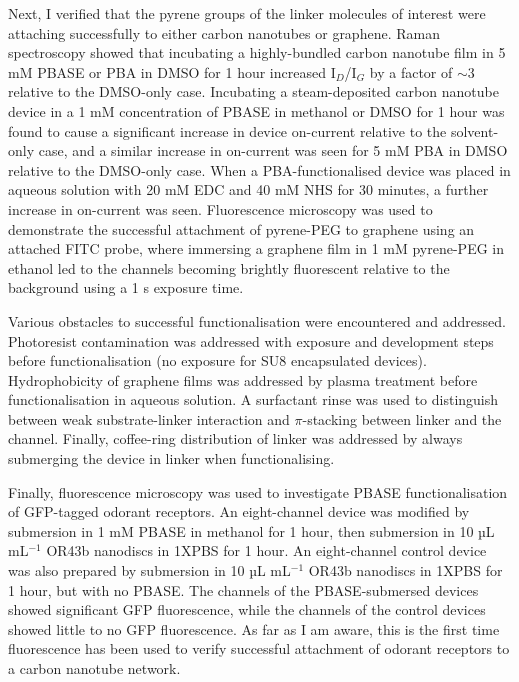 \documentclass[
  a4paper,
]{scrbook}
\begin{document}
Next, I verified that the pyrene groups of the linker molecules of
interest were attaching successfully to either carbon nanotubes or
graphene. Raman spectroscopy showed that incubating a highly-bundled
carbon nanotube film in 5 mM PBASE or PBA in DMSO for 1 hour increased
I\(_D\)/I\(_G\) by a factor of \(\sim 3\) relative to the DMSO-only
case. Incubating a steam-deposited carbon nanotube device in a 1 mM
concentration of PBASE in methanol or DMSO for 1 hour was found to cause
a significant increase in device on-current relative to the solvent-only
case, and a similar increase in on-current was seen for 5 mM PBA in DMSO
relative to the DMSO-only case. When a PBA-functionalised device was
placed in aqueous solution with 20 mM EDC and 40 mM NHS for 30 minutes,
a further increase in on-current was seen. Fluorescence microscopy was
used to demonstrate the successful attachment of pyrene-PEG to graphene
using an attached FITC probe, where immersing a graphene film in 1 mM
pyrene-PEG in ethanol led to the channels becoming brightly fluorescent
relative to the background using a 1 s exposure time.

Various obstacles to successful functionalisation were encountered and
addressed. Photoresist contamination was addressed with exposure and
development steps before functionalisation (no exposure for SU8
encapsulated devices). Hydrophobicity of graphene films was addressed by
plasma treatment before functionalisation in aqueous solution. A
surfactant rinse was used to distinguish between weak substrate-linker
interaction and \(\pi\)-stacking between linker and the channel.
Finally, coffee-ring distribution of linker was addressed by always
submerging the device in linker when functionalising.

Finally, fluorescence microscopy was used to investigate PBASE
functionalisation of GFP-tagged odorant receptors. An eight-channel
device was modified by submersion in 1 mM PBASE in methanol for 1 hour,
then submersion in 10 µL mL\(^{-1}\) OR43b nanodiscs in 1XPBS for 1
hour. An eight-channel control device was also prepared by submersion in
10 µL mL\(^{-1}\) OR43b nanodiscs in 1XPBS for 1 hour, but with no
PBASE. The channels of the PBASE-submersed devices showed significant
GFP fluorescence, while the channels of the control devices showed
little to no GFP fluorescence. As far as I am aware, this is the first
time fluorescence has been used to verify successful attachment of
odorant receptors to a carbon nanotube network.

\end{document}
